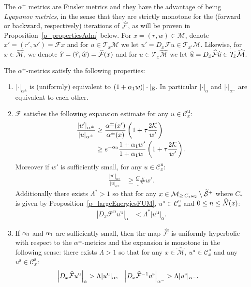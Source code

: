 \documentclass[10pt]{amsart}
\theoremstyle{definition}\newtheorem{defi}[theo]{Definition}\newtheorem{rema}[theo]{Remark}\newtheorem{exam}[theo]{Example}\newtheorem{exem}[theo]{Example}\newtheorem{nota}[theo]{Notation}
\newcommand{\ct}{r}
\newcommand{\fft}{\tau}
\newcommand{\const}{C_\#}
\newcommand{\inv}{^{-1}}
\newcommand{\unstable}{\text{u}}
\newcommand{\stable}{\text{s}}
\newcommand{\cK}{\mathcal{K}}
\newcommand{\tang}{\mathcal{T}}
\newcommand{\cm}{\mathcal{F}}
\newcommand{\csp}{\mathcal{M}}
\newcommand{\cmp}{\hat\cm}
\newcommand{\cone}{\mathcal{C}}
\newcommand{\cspl}[1]{\csp_{\ge\,#1}}
\newcommand{\cspi}{\widehat{\csp}}
\newcommand{\coneu}{\cone^\unstable}
\newcommand{\cones}{\cone^\stable}
\newcommand{\eum}{_\text{E}}
\newcommand{\singPrivate}{\mathcal{S}}
\newcommand{\singt}[1]{\tilde{\singPrivate}^{#1}}
\newcommand{\law}[1]{\omega_{#1}}
\newcommand{\adm}{_{\alpha^{+}}}
\newcommand{\adms}{_{\alpha^{-}}}
\newcommand{\admPm}{_{\alpha^{\pm}}}
\newcommand{\admNamePm}{\alpha^{\pm}}
\newcommand\admParam[1]{
\ifnum0=#1\relax
\alpha_0
\else
\ifnum1=#1\relax
\alpha_1\fi\fi}
\newcommand{\Np}{\hat N}
\renewcommand{\adm}{_{\alpha}}
\newcommand*{\relabel}{\renewcommand{\labelenumi}{(\theenumi)}}
\newcommand*{\alphenumi}{\renewcommand*{\theenumi}{\alph{enumi}}\relabel}
\let\oldtilde\tilde
\renewcommand*{\tilde}[1]{\mathchoice{\widetilde{#1}}{\widetilde{#1}}{\oldtilde{#1}}{\oldtilde{#1}}}
\let\oldhat\hat
\renewcommand*{\hat}[1]{\mathchoice{\widehat{#1}}{\widehat{#1}}{\oldhat{#1}}{\oldhat{#1}}}
\begin{document}
The $\admNamePm$ metrics are Finsler metrics and they have the advantage of being \emph{Lyapunov metrics}, in the sense that they are strictly monotone for the (forward or backward, respectively) iterations of $\cmp$, as will be proven in Proposition~\ref{p_propertiesAdm} below. 
 For $x = (\ct,w)\in\csp$, denote $x' = (\ct',w') = \cm x$ and for $u\in\tang_x\csp$ we let $u' = D_{x}\cm u\in\tang_{x'}\csp$. Likewise, for $x\in\cspi$, we denote $\hat x = (\hat\ct,\hat w) = \cmp(x)$ and for $u\in\tang_x\cspi$ we let $\hat u= D_{\hat x}\cmp\hat u\in\tang_{\hat x}\cspi$.

\pagebreak
\begin{prop}\label{p_propertiesAdm}
The $\admNamePm$-metrics satisfy the following properties:
\begin{enumerate}\alphenumi
\item\label{i_admeum}
$|\cdot|\admPm$ is (uniformly) equivalent to $(1+\admParam1 w)|\cdot|\eum$. In particular $|\cdot|\adm$ and $|\cdot|\adms$ are equivalent to each other.
\item\label{i_expansionAdm}
$\cm$ satisfies the following expansion estimate for any $u\in\coneu_x$:
\begin{subequations}\label{e_expansionAdm-two}
\begin{align}
\frac{|u'|\admPm}{|u|\admPm} &\ge \frac{\alpha^{\pm}(x')}{\alpha^\pm(x)}\left(1+\fft\frac{2\cK}{w'}\right)\label{e_expansionAdm-alpha}\\
&\ge e^{-\admParam0}\frac{1+\admParam1 w'}{1+\admParam1 w\phantom'}\left(1+\fft\frac{2\cK}{w'}\right).\label{e_expansionAdm}
\end{align}
\end{subequations}%
Moreover if $w'$ is sufficiently small, for any $u\in\coneu_x$:
\begin{align}\label{e_expansionAdm-II}
\frac{|u'|\admPm}{|u|\admPm} &\ge \frac\const{w'}.
\end{align}
Additionally there exists $\Lambda^{*} > 1$ so that for any $x\in\cspl{C_{*}\law2}\setminus\singt{+}$ where $C_{*}$ is given by Proposition~\ref{p_largeEnergiesFUM}, $u^{\unstable}\in\coneu_x$ and $0\le n\le \Np(x)$:
\begin{align}\label{e_boundedExpansion}
|D_{x}\cm^{n}u^{\unstable} |\adm& < \Lambda^{*}|u^{\unstable}|\adm.
\end{align}
\item\label{i_uniformHyperbolicity}
If $\admParam0$ and $\admParam1$ are sufficiently small, then the map $\cmp$ is uniformly hyperbolic with respect to the $\admNamePm$-metrics and the expansion is monotone in the following sense: there exists $\Lambda>1$ so that for any $x\in\cspi$, $u^{\unstable}\in\coneu_x$ and any $u^{\stable}\in\cones_x$:
\begin{align}\label{e_uniformHyperbolicity}
\left|D_{x}\cmp u^{\unstable}\right|\adm&>\Lambda|u^{\unstable}|\adm, &\left|D_{x}\cmp\inv u^{\stable}\right|\adms&>\Lambda|u^{\stable}|\adms.
\end{align}
\end{enumerate}
\end{prop}
\end{document}
